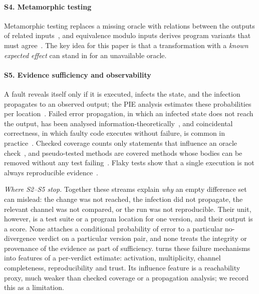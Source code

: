 \paragraph*{S4. Metamorphic testing} Metamorphic testing replaces a missing oracle with relations between the outputs of related inputs~\cite{chen2018metamorphic,segura2016survey}, and equivalence modulo inputs derives program variants that must agree~\cite{le2014compiler}. The key idea for this paper is that a transformation with a \emph{known expected effect} can stand in for an unavailable oracle.

\paragraph*{S5. Evidence sufficiency and observability} A fault reveals itself only if it is executed, infects the state, and the infection propagates to an observed output; the PIE analysis estimates these probabilities per location~\cite{voas1992pie}. Failed error propagation, in which an infected state does not reach the output, has been analysed information-theoretically~\cite{androutsopoulos2014analysis}, and coincidental correctness, in which faulty code executes without failure, is common in practice~\cite{masri2014prevalence}. Checked coverage counts only statements that influence an oracle check~\cite{schuler2011assessing,schuler2013checked}, and pseudo-tested methods are covered methods whose bodies can be removed without any test failing~\cite{niedermayr2016will,veraperez2018descartes,veraperez2019comprehensive}. Flaky tests show that a single execution is not always reproducible evidence~\cite{luo2014empirical,parry2022survey}.

\emph{Where S2--S5 stop.} Together these streams explain \emph{why} an empty difference set can mislead: the change was not reached, the infection did not propagate, the relevant channel was not compared, or the run was not reproducible. Their unit, however, is a test suite or a program location for one version, and their output is a score. None attaches a conditional probability of error to a particular no-divergence verdict on a particular version pair, and none treats the integrity or provenance of the evidence as part of sufficiency. \sbg{} turns these failure mechanisms into features of a per-verdict estimate: activation, multiplicity, channel completeness, reproducibility and trust. Its influence feature is a reachability proxy, much weaker than checked coverage or a propagation analysis; we record this as a limitation.

